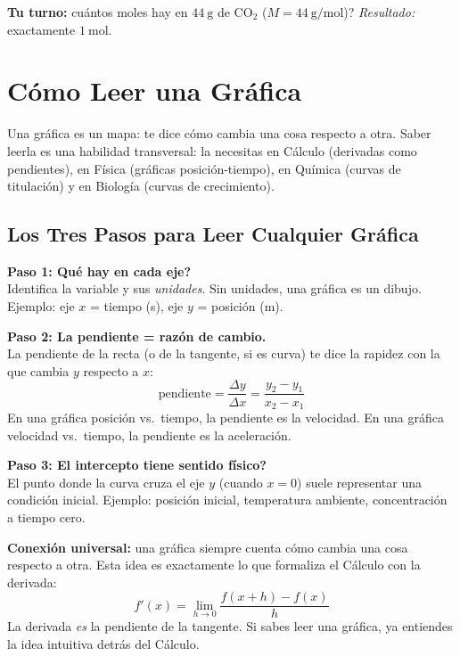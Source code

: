 \documentclass[12pt, letterpaper]{article}
\begin{document}
\noindent\textbf{Tu turno:} \textquestiondown cuántos moles hay en $44\ \text{g}$ de CO$_2$ ($M = 44\ \text{g/mol}$)? \emph{Resultado:} exactamente $1\ \text{mol}$.


\section{Cómo Leer una Gráfica}

Una gráfica es un mapa: te dice cómo cambia una cosa respecto a otra. Saber leerla es una habilidad transversal: la necesitas en Cálculo (derivadas como pendientes), en Física (gráficas posición-tiempo), en Química (curvas de titulación) y en Biología (curvas de crecimiento).

\subsection{Los Tres Pasos para Leer Cualquier Gráfica}

\begin{cuadropasos}
  \textbf{Paso 1: \textquestiondown Qué hay en cada eje?}\\
  Identifica la variable y sus \emph{unidades}. Sin unidades, una gráfica es un dibujo. Ejemplo: eje $x$ = tiempo (s), eje $y$ = posición (m).

  \vspace{6pt}
  \textbf{Paso 2: La pendiente = razón de cambio.}\\
  La pendiente de la recta (o de la tangente, si es curva) te dice la rapidez con la que cambia $y$ respecto a $x$:
  \[
    \text{pendiente} = \frac{\Delta y}{\Delta x} = \frac{y_2 - y_1}{x_2 - x_1}
  \]
  En una gráfica posición vs.\ tiempo, la pendiente es la velocidad. En una gráfica velocidad vs.\ tiempo, la pendiente es la aceleración.

  \vspace{6pt}
  \textbf{Paso 3: \textquestiondown El intercepto tiene sentido físico?}\\
  El punto donde la curva cruza el eje $y$ (cuando $x = 0$) suele representar una condición inicial. Ejemplo: posición inicial, temperatura ambiente, concentración a tiempo cero.
\end{cuadropasos}

\begin{cuadroteoria}
  \textbf{Conexión universal:} una gráfica siempre cuenta cómo cambia una cosa respecto a otra. Esta idea es exactamente lo que formaliza el Cálculo con la derivada:
  \[
    f'(x) = \lim_{h \to 0} \frac{f(x+h) - f(x)}{h}
  \]
  La derivada \emph{es} la pendiente de la tangente. Si sabes leer una gráfica, ya entiendes la idea intuitiva detrás del Cálculo.
\end{cuadroteoria}
\end{document}
